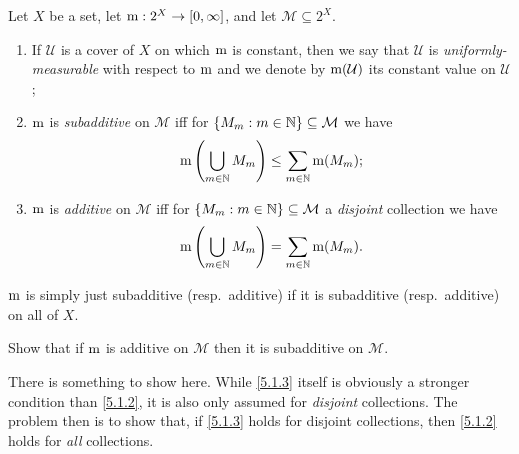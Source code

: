 \begin{dfn}
Let $X$ be a set, let $\mathrm{m} :2^X\rightarrow [0,\infty ]$, and let $\mathcal{M}\subseteq 2^X$.  
\begin{enumerate}
\item If $\mathcal{U}$ is a cover of $X$ on which $\mathrm{m}$ is constant, then we say that $\mathcal{U}$ is \emph{uniformly-measurable} with respect to $\mathrm{m}$ and we denote by $\mathrm{m} (\mathcal{U})$ its constant value on $\mathcal{U}$;
\item $\mathrm{m}$ is \emph{subadditive} on $\mathcal{M}$ iff for $\{ M_m:m\in \mathbb{N} \} \subseteq \mathcal{M}$ we have
\begin{equation}\label{5.1.2}
\mathrm{m} \left( \bigcup _{m\in \mathbb{N}}M_m\right) \leq \sum _{m\in \mathbb{N}}\mathrm{m} (M_m);
\end{equation}
\item $\mathrm{m}$ is \emph{additive} on $\mathcal{M}$ iff for $\{ M_m:m\in \mathbb{N} \} \subseteq \mathcal{M}$ a \emph{disjoint} collection we have
\begin{equation}\label{5.1.3}
\mathrm{m} \left( \bigcup _{m\in \mathbb{N}}M_m\right) =\sum _{m\in \mathbb{N}}\mathrm{m} (M_m).
\end{equation}
\end{enumerate}
$\mathrm{m}$ is simply just subadditive (resp.~additive) if it is subadditive (resp.~additive) on all of $X$.
\end{dfn}
\begin{exr}\label{exr5.1.4}
Show that if $\mathrm{m}$ is additive on $\mathcal{M}$ then it is subadditive on $\mathcal{M}$.
\begin{rmk}
There is something to show here.  While \eqref{5.1.3} itself is obviously a stronger condition than \eqref{5.1.2}, it is also only assumed for \emph{disjoint} collections.  The problem then is to show that, if \eqref{5.1.3} holds for disjoint collections, then \eqref{5.1.2} holds for \emph{all} collections.
\end{rmk}
\end{exr}
